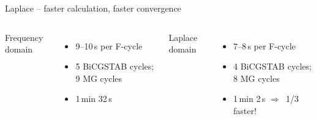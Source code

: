 \documentclass[xcolor=svgnames, aspectratio=169]{beamer}
\newcommand{\dra}{\ensuremath{\Rightarrow }~}
\begin{document}
  \begin{frame}%
    {Laplace -- faster calculation, faster convergence}
    \vfill
    \begin{columns}[t]
        \alert{Frequency domain}
        \begin{itemize}
          \item 9--10\,s per F-cycle
          \item 5 BiCGSTAB cycles; 9 MG cycles
          \item 1\,min 32\,s
        \end{itemize}
        \alert{Laplace domain}
        \begin{itemize}
          \item 7--8\,s per F-cycle
          \item 4 BiCGSTAB cycles; 8 MG cycles
          \item 1\,min 2\,s \dra 1/3 faster!
        \end{itemize}
    \end{columns}
    \vspace{1em}


\end{frame}
\end{document}
